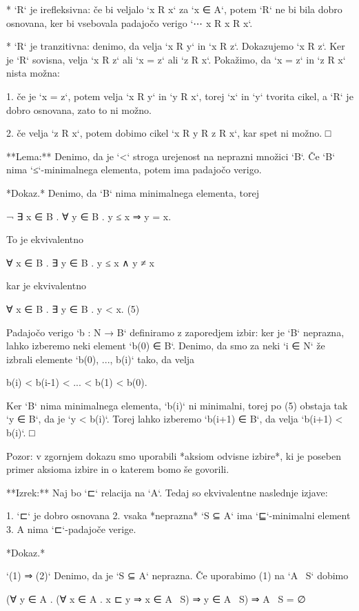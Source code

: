 * `R` je irefleksivna: če bi veljalo `x R x` za `x ∈ A`, potem `R` ne bi bila dobro
  osnovana, ker bi vsebovala padajočo verigo `⋯ x R x R x`.

* `R` je tranzitivna: denimo, da velja `x R y` in `x R z`. Dokazujemo `x R z`. Ker je `R`
  sovisna, velja `x R z` ali `x = z` ali `z R x`. Pokažimo, da `x = z` in `z R x` nista
  možna:

      1. če je `x = z`, potem velja `x R y` in `y R x`, torej `x` in `y` tvorita cikel, a
         `R` je dobro osnovana, zato to ni možno.

      2. če velja `z R x`, potem dobimo cikel `x R y R z R x`, kar spet ni možno. □


**Lema:** Denimo, da je `<` stroga urejenost na neprazni množici `B`. Če `B` nima
`≤`-minimalnega elementa, potem ima padajočo verigo.

*Dokaz.* Denimo, da `B` nima minimalnega elementa, torej

    ¬ ∃ x ∈ B . ∀ y ∈ B . y ≤ x ⇒ y = x.

To je ekvivalentno

    ∀ x ∈ B . ∃ y ∈ B . y ≤ x ∧ y ≠ x

kar je ekvivalentno

    ∀ x ∈ B . ∃ y ∈ B . y < x.               (5)

Padajočo verigo `b : N → B` definiramo z zaporedjem izbir: ker je `B` neprazna, lahko izberemo
neki element `b(0) ∈ B`. Denimo, da smo za neki `i ∈ N` že izbrali elemente `b(0), ..., b(i)`
tako, da velja

    b(i) < b(i-1) < ... < b(1) < b(0).

Ker `B` nima minimalnega elementa, `b(i)` ni minimalni, torej po (5) obstaja tak `y ∈ B`, da je
`y < b(i)`. Torej lahko izberemo `b(i+1) ∈ B`, da velja `b(i+1) < b(i)`. □

Pozor: v zgornjem dokazu smo uporabili *aksiom odvisne izbire*, ki je poseben primer
aksioma izbire in o katerem bomo še govorili.

**Izrek:** Naj bo `⊏` relacija na `A`. Tedaj so ekvivalentne naslednje izjave:

1. `⊏` je dobro osnovana
2. vsaka *neprazna* `S ⊆ A` ima `⊑`-minimalni element
3. A nima `⊏`-padajoče verige.

*Dokaz.*

`(1) ⇒ (2)` Denimo, da je `S ⊆ A` neprazna. Če uporabimo (1) na `A \ S` dobimo

     (∀ y ∈ A . (∀ x ∈ A . x ⊏ y ⇒ x ∈ A \ S) ⇒ y ∈ A \ S) ⇒ A \ S = ∅

